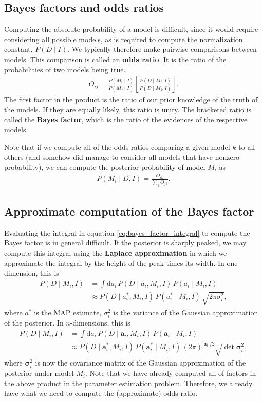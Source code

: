\subsection{Bayes factors and odds ratios}
Computing the absolute probability of a model is difficult, since it
would require considering all possible models, as is required to
compute the normalization constant, $P(D\mid I)$.  We typically
therefore make pairwise comparisons between models.  This comparison
is called an \textbf{odds ratio}.  It is the ratio of the
probabilities of two models being true.
\begin{align}
O_{ij} = \frac{P(M_i\mid I)}{P(M_j\mid I)}
\left[\frac{P(D\mid M_i, I)}{P(D\mid M_j, I)}\right].
\end{align}
The first factor in the product is the ratio of our prior knowledge of
the truth of the models.  If they are equally likely, this ratio is
unity.  The bracketed ratio is called the \textbf{Bayes factor}, which
is the ratio of the evidences of the respective models.

Note that if we compute all of the odds ratios comparing a given model
$k$ to all others (and somehow did manage to consider all models that
have nonzero probability), we can compute the posterior probability of
model $M_i$ as
\begin{align}
P(M_i\mid D, I) = \frac{O_{ik}}{\sum_j O_{jk}}.
\end{align}


\subsection{Approximate computation of the Bayes factor}
Evaluating the integral in equation \eqref{eq:bayes_factor_integral} to
compute the Bayes factor is in general difficult.  If the posterior is
sharply peaked, we may compute this integral using the
\textbf{Laplace approximation} in which we approximate the integral
by the height of the peak times its width.  In one dimension, this is
\begin{align}
P(D\mid M_i, I) &= \int \mathrm{d}a_i\,P(D\mid a_i, M_i, I)\,P(a_i\mid M_i, I) \nonumber \\
&\approx P(D\mid a_i^*, M_i, I)\,P(a_i^*\mid M_i, I)\,\sqrt{2\pi\sigma_i^2},
\end{align}
where $a^*$ is the MAP estimate, $\sigma_i^2$ is the variance of the
Gaussian approximation of the posterior.  In $n$-dimensions, this is
\begin{align}
P(D\mid M_i, I) &= \int \mathrm{d}a_i\,P(D\mid \mathbf{a}_i, M_i, I)\,P(\mathbf{a}_i\mid M_i, I) \\
&\approx P(D\mid \mathbf{a}_i^*, M_i, I)\,P(\mathbf{a}_i^*\mid M_i, I)\,\left(2\pi\right)^{|\mathbf{a}_i|/2}\sqrt{\det\boldsymbol{\sigma}_i^2},
\end{align}
where $\boldsymbol{\sigma}_i^2$ is now the covariance matrix of the
Gaussian approximation of the posterior under model $M_i$.  Note that we have already
computed all of factors in the above product in the parameter estimation
problem.  Therefore, we already have what we need to compute the (approximate) odds ratio.


